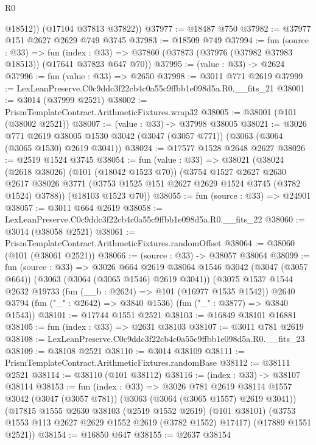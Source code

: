 \begin{lexlean}{R0}
\begin{coremodule}
          @18512))
      (@17104 @37813 @37822))
@37977 := @18487 @750
@37982 := @37977 @151 @2627 @2629 @749 @3745
@37983 := @18509 @749
@37994 := fun (source : @33) =>
  fun (index : @33) => @37860 (@37873 (@37976 (@37982 @37983 @18513)) (@17641 @37823 @647 @70))
@37995 := (value : @33) -> @2624
@37996 := fun (value : @33) => @2650
@37998 := @3011 @771 @2619
@37999 := LexLeanPreserve.C0c9ddc3f22cb4c0a55c9ffbb1e098d5a.R0.__fits_21
@38001 := @3014 (@37999 @2521)
@38002 := PrismTemplateContract.ArithmeticFixtures.wrap32
@38005 := @38001 (@101 (@38002 @2521))
@38007 := (value : @33) -> @37998 @38005
@38021 := @3026
    @771
    @2619
    @38005
    @1530
    @3042
    (@3047 (@3057 @771))
    (@3063 (@3064 (@3065 @1530) @2619 @3041))
@38024 := @17577 @1528 @2648 @2627
@38026 := @2519 @1524 @3745
@38054 := fun (value : @33) =>
  @38021
    (@38024
      (@2618 @38026)
      (@101 (@18042 @1523 @70))
      (@3754
        @1527
        @2627
        @2630
        @2617
        @38026
        @3771
        (@3753 @1525 @151 @2627 @2629 @1524 @3745 (@3782 @1524) @3788))
      (@18103 @1523 @70))
@38055 := fun (source : @33) => @24901
@38057 := @3011 @664 @2619
@38058 := LexLeanPreserve.C0c9ddc3f22cb4c0a55c9ffbb1e098d5a.R0.__fits_22
@38060 := @3014 (@38058 @2521)
@38061 := PrismTemplateContract.ArithmeticFixtures.randomOffset
@38064 := @38060 (@101 (@38061 @2521))
@38066 := (source : @33) -> @38057 @38064
@38099 := fun (source : @33) =>
  @3026
    @664
    @2619
    @38064
    @1546
    @3042
    (@3047 (@3057 @664))
    (@3063 (@3064 (@3065 @1546) @2619 @3041))
    (@3075
      @1537
      @1544
      @2632
      @19733
      (fun (__b : @2624) => @101 (@16977 @1535 @1542))
      @2640
      @3794
      (fun ("_" : @2642) => @3840 @1536)
      (fun ("_" : @3877) => @3840 @1543))
@38101 := @17744 @1551 @2521
@38103 := @16849 @38101 @16881
@38105 := fun (index : @33) => @2631 @38103
@38107 := @3011 @781 @2619
@38108 := LexLeanPreserve.C0c9ddc3f22cb4c0a55c9ffbb1e098d5a.R0.__fits_23
@38109 := @38108 @2521
@38110 := @3014 @38109
@38111 := PrismTemplateContract.ArithmeticFixtures.randomBase
@38112 := @38111 @2521
@38114 := @38110 (@101 @38112)
@38116 := (index : @33) -> @38107 @38114
@38153 := fun (index : @33) =>
  @3026
    @781
    @2619
    @38114
    @1557
    @3042
    (@3047 (@3057 @781))
    (@3063 (@3064 (@3065 @1557) @2619 @3041))
    (@17815
      @1555
      @2630
      @38103
      (@2519 @1552 @2619)
      (@101 @38101)
      (@3753 @1553 @113 @2627 @2629 @1552 @2619 (@3782 @1552) @17417)
      (@17889 @1551 @2521))
@38154 := @16850 @647
@38155 := @2637 @38154

\end{coremodule}
\end{lexlean}
